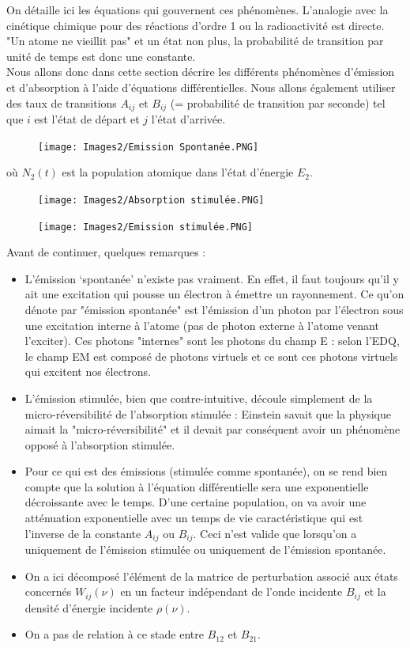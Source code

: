 On détaille ici les équations qui gouvernent ces phénomènes. L'analogie avec la cinétique chimique pour des réactions d'ordre 1 ou la radioactivité est directe. "Un atome ne vieillit pas" et un état non plus, la probabilité de transition par unité de temps est donc une constante.\\
Nous allons donc dans cette section décrire les différents phénomènes d'émission et d'absorption à l'aide d'équations différentielles. Nous allons également utiliser des taux de transitions $A_{ij}$ et $B_{ij}$ (= probabilité de transition par seconde) tel que $i$ est l'état de départ et $j$ l'état d'arrivée.
\begin{figure}[tph]
    \centering
    \texttt{[image: Images2/Emission Spontanée.PNG]}
    \label{fig:emission_spont}
\end{figure}
où $N_2(t)$ est la population atomique dans l'état d'énergie $E_2$.
\begin{figure}[tph]
    \texttt{[image: Images2/Absorption stimulée.PNG]}
    \label{fig:absorb_stimul}
\end{figure}
\begin{figure}[tph]
    \texttt{[image: Images2/Emission stimulée.PNG]}
    \label{fig:emission_stimul}
\end{figure}
Avant de continuer, quelques remarques :
\begin{itemize}[label=$\bullet$]
    \item L'émission `spontanée' n'existe pas vraiment. En effet, il faut toujours qu'il y ait une excitation qui pousse un électron à émettre un rayonnement. Ce qu'on dénote par "émission spontanée" est l'émission d'un photon par l'électron sous une excitation interne à l'atome (pas de photon externe à l'atome venant l'exciter). Ces photons "internes" sont les photons du champ E : selon l'EDQ, le champ EM est composé de photons virtuels et ce sont ces photons virtuels qui excitent nos électrons.
    \item L'émission stimulée, bien que contre-intuitive, découle simplement de la micro-réversibilité de l'absorption stimulée : Einstein savait que la physique aimait la "micro-réversibilité" et il devait par conséquent avoir un phénomène opposé à l'absorption stimulée.
    \item Pour ce qui est des émissions (stimulée comme spontanée), on se rend bien compte que la solution à l'équation différentielle sera une exponentielle décroissante avec le temps. D'une certaine population, on va avoir une atténuation exponentielle avec un temps de vie caractéristique qui est l'inverse de la constante $A_{ij}$ ou $B_{ij}$. Ceci n'est valide que lorsqu'on a uniquement de l'émission stimulée ou uniquement de l'émission spontanée.
    \item On a ici décomposé l'élément de la matrice de perturbation associé aux états concernés $W_{ij}(\nu)$ en un facteur indépendant de l'onde incidente $B_{ij}$ et la densité d'énergie incidente $\rho(\nu)$.
    \item On a pas de relation à ce stade entre $B_{12}$ et $B_{21}$.
\end{itemize}
